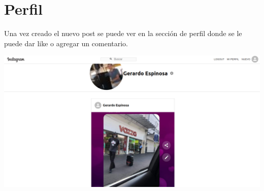 \documentclass[12pt,a4paper]{article}
\begin{document}
	
	\section{Perfil}
	Una vez creado el nuevo post se puede ver  en la sección de perfil donde se le puede dar like o agregar un comentario.
	
	\includegraphics[scale=0.20]{Perfil}
	
\end{document}
